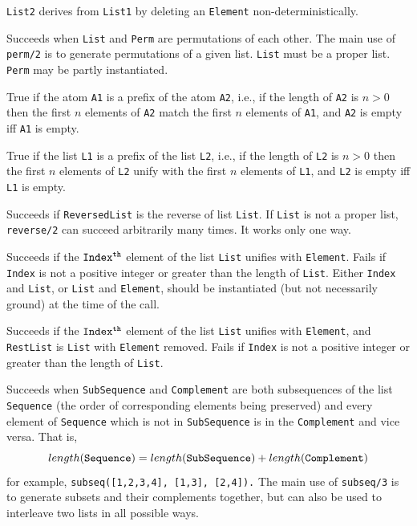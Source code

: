 \begin{description}
 {\tt List2}
derives from {\tt List1} by deleting an {\tt Element}
non-deterministically.

    Succeeds when {\tt List} and {\tt Perm} are permutations of each
    other.  The main use of {\tt perm/2} is to generate permutations
    of a given list.  {\tt List} must be a proper list.
    {\tt Perm} may be partly instantiated.

 True if
the atom {\tt A1} is a prefix of the atom {\tt A2}, i.e., if the
length of {\tt A2} is $n>0$ then the first $n$ elements of {\tt A2}
match the first $n$ elements of {\tt A1}, and {\tt A2} is empty
iff {\tt A1} is empty.

 True if
the list {\tt L1} is a prefix of the list {\tt L2}, i.e., if the
length of {\tt L2} is $n>0$ then the first $n$ elements of {\tt L2}
unify with the first $n$ elements of {\tt L1}, and {\tt L2} is empty
iff {\tt L1} is empty.

    Succeeds if {\tt ReversedList} is the reverse of list {\tt List}.
    If {\tt List} is not a proper list, {\tt reverse/2} can succeed
    arbitrarily many times.  It works only one way.

    Succeeds if the ${\tt Index^{th}}$ element of the list {\tt List} 
    unifies with {\tt Element}.  Fails if {\tt Index} is not a positive
    integer or greater than the length of {\tt List}.
    Either {\tt Index} and {\tt List}, or {\tt List} and {\tt Element}, 
    should be instantiated (but not necessarily ground) at the time of 
    the call.

    Succeeds if the ${\tt Index^{th}}$ element of the list {\tt List}
    unifies with {\tt Element}, and {\tt RestList} is {\tt List} with
    {\tt Element} removed.  Fails if {\tt Index} is not a positive
    integer or greater than the length of {\tt List}.

    Succeeds when {\tt SubSequence} and {\tt Complement} are both
    subsequences of the list {\tt Sequence} (the order of corresponding
    elements being preserved) and every element of {\tt Sequence} which
    is not in {\tt SubSequence} is in the {\tt Complement} and vice
    versa.  That is,
    \[ length({\tt Sequence}) =
                length({\tt SubSequence})+length({\tt Complement}) \]
    for example, {\tt subseq([1,2,3,4], [1,3], [2,4]).}
    The main use of {\tt subseq/3} is to generate subsets and their
    complements together, but can also be used to interleave two lists
    in all possible ways.


\end{description}
